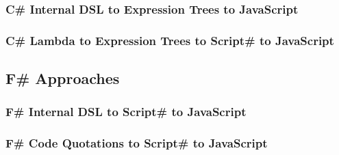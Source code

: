 
		\subsubsection{C\# Internal DSL to Expression Trees to JavaScript} %
		\label{ssub:c_internal_dsl_to_expression_trees_to_javascript}
		

		\subsubsection{C\# Lambda to Expression Trees to Script\# to JavaScript} %
		\label{ssub:c_lambda_to_expression_trees_to_script_to_javascript}
		


	\subsection{F\# Approaches} %
	\label{sub:f_approaches}
	
		\subsubsection{F\# Internal DSL to Script\# to JavaScript} %
		\label{ssub:f_internal_dsl_to_script_to_javascript}
		

		\subsubsection{F\# Code Quotations to Script\# to JavaScript} %
		\label{ssub:f_code_quotations_to_script_to_javascript}
		





